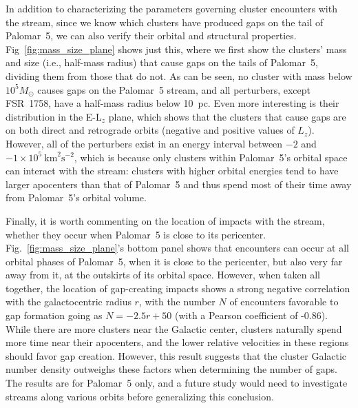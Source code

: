 \documentclass{aa}
\begin{document}
    In addition to characterizing the parameters governing cluster encounters with the stream, since we know which clusters have produced gaps on the tail of Palomar~5, we can also verify their orbital and structural properties. Fig~\ref{fig:mass_size_plane} shows just this, where we first show the clusters' mass and size (i.e., half-mass radius) that cause gaps on the tails of Palomar~5, dividing them from those that do not. As can be seen, no cluster with mass below $10^5 M_\odot$ causes gaps on the Palomar~5 stream, and all perturbers, except FSR~1758, have a half-mass radius below 10~pc. Even more interesting is their distribution in the E-L$_z$ plane, which shows that the clusters that cause gaps are on both direct and retrograde orbits (negative and positive values of $L_z$). However, all of the perturbers exist in an energy interval between $-2$ and $-1 \times10^5~\textrm{km}^2\textrm{s}^{-2}$, which is because only clusters within Palomar~5's orbital space can interact with the stream: clusters with higher orbital energies tend to have larger apocenters than that of Palomar~5 and thus spend most of their time away from Palomar~5's orbital volume. 
    
    Finally, it is worth commenting on the location of impacts with the stream, whether they occur when Palomar~5 is close to its pericenter. Fig.~\ref{fig:mass_size_plane}'s bottom panel shows that encounters can occur at all orbital phases of Palomar~5, when it is close to the pericenter, but also very far away from it, at the outskirts of its orbital space. However, when taken all together, the location of gap-creating impacts shows a strong negative correlation with the galactocentric radius $r$, with the number $N$ of encounters favorable to gap formation going as $N = -2.5r + 50$ (with a Pearson coefficient of -0.86). While there are more clusters near the Galactic center, clusters naturally spend more time near their apocenters, and the lower relative velocities in these regions should favor gap creation. However, this result suggests that the cluster Galactic number density outweighs these factors when determining the number of gaps. The results are for Palomar~5 only, and a future study would need to investigate streams along various orbits before generalizing this conclusion.
    

\end{document}
